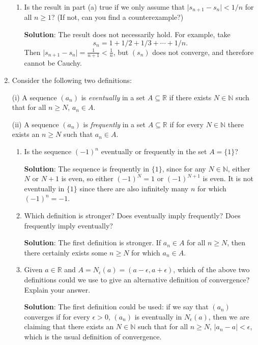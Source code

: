 \documentclass[letterpaper,12pt]{article}
\newcommand{\R}{\mathbb{R}}
\newcommand{\N}{\mathbb{N}}
\renewcommand{\ss}{\subseteq}
\newcommand{\abs}[1]{\lvert #1\rvert}
\begin{document}
\begin{enumerate}
\begin{enumerate}
	\item Is the result in part (a) true if we only assume that $\abs{s_{n+1}-s_n}<1/n$ for all $n\geq 1$? (If not, can you find a counterexample?)
	 
\bigskip

{\bf Solution}: The result does not necessarily hold. For example, take
\[
s_n = 1+1/2+1/3+\cdots + 1/n.
\] 
Then $\abs{s_{n+1}-s_n} = \frac{1}{n+1}<\frac{1}{n}$, but $(s_n)$ does not converge, and therefore cannot be Cauchy.
       \end{enumerate}


 \item Consider the following two definitions:

(i) A sequence $(a_n)$ is {\em eventually} in a set $A\ss\R$ if there exists $N\in\N$ such that for all $n\geq N$, $a_n\in A$.

(ii) A sequence $(a_n)$ is {\em frequently} in a set $A\ss\R$ if for every $N\in\N$ there exists an $n\geq N$ such that $a_n\in A$.

\begin{enumerate}
 \item Is the sequence $(-1)^n$ eventually or frequently in the set $A=\{1\}$?
  
\bigskip

{\bf Solution}: The sequence is frequently in $\{1\}$, since for any $N\in \N$, either $N$ or $N+1$ is even, so either $(-1)^N=1$ or $(-1)^{N+1}$ is even. It is not eventually in $\{1\}$ since there are also infinitely many $n$ for which $(-1)^n=-1$.

 \item Which definition is stronger? Does eventually imply frequently? Does frequently imply eventually?
 
\bigskip

{\bf Solution}: The first definition is stronger. If $a_n\in A$ for all $n\geq N$, then there certainly exists some $n\geq N$ for which $a_n\in A$.

 \item Given $a\in \R$ and $A = N_\epsilon(a) = (a-\epsilon,a+\epsilon)$, which of the above two definitions could we use to give an alternative definition of convergence? Explain your answer.
 
  
\bigskip

{\bf Solution}: The first definition could be used: if we say that $(a_n)$ converges if for every $\epsilon>0$,  $(a_n)$ is eventually in $N_\epsilon(a)$, then we are claiming that there exists an $N\in\N$ such that for all $n\geq N$, $\abs{a_n-a}<\epsilon$, which is the usual definition of convergence.


\end{enumerate}
\end{enumerate}
\end{document}
